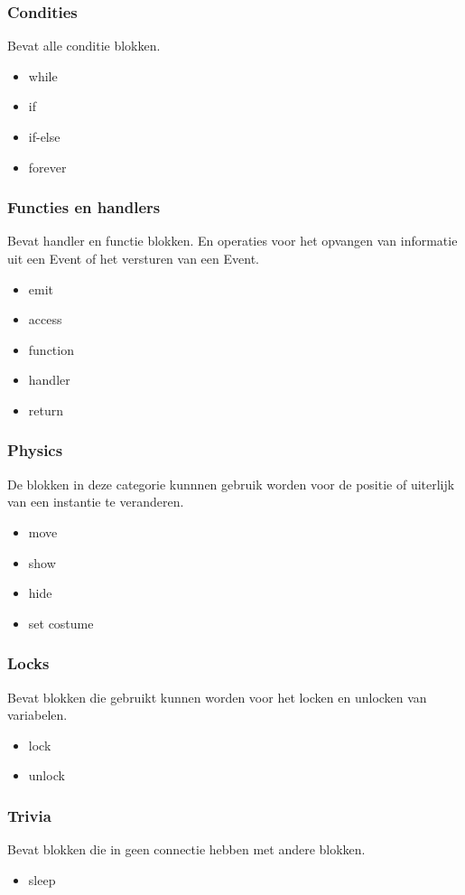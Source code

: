 \documentclass[]{article}
\begin{document}
\subsubsection{Condities}
Bevat alle conditie blokken.
\begin{itemize}
\item while
\item if
\item if-else
\item forever
\end{itemize}
\subsubsection{Functies en handlers}
Bevat handler en functie blokken. En operaties voor het opvangen van informatie uit een Event of het versturen van een Event.
\begin{itemize}
\item emit
\item access
\item function
\item handler
\item return
\end{itemize}
\subsubsection{Physics}
De blokken in deze categorie kunnnen gebruik worden voor de positie of uiterlijk van een instantie te veranderen.
\begin{itemize}
\item move
\item show
\item hide
\item set costume
\end{itemize}
\subsubsection{Locks}
Bevat blokken die gebruikt kunnen worden voor het locken en unlocken van variabelen.
\begin{itemize}
\item lock
\item unlock
\end{itemize}
\subsubsection{Trivia}
Bevat blokken die in geen connectie hebben met andere blokken.
\begin{itemize}
\item sleep
\end{itemize}
\end{document}
